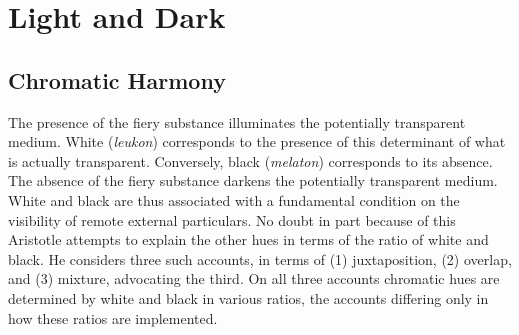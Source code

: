 \chapter{Light and Dark} %
\label{cha:light_and_dark}

\section{Chromatic Harmony} %
\label{sec:chromatic_harmony}
The presence of the fiery substance illuminates the potentially transparent me\-di\-um. White (\emph{leukon}) corresponds to the presence of this determinant of what is actually transparent. Conversely, black (\emph{melaton}) corresponds to its absence. The absence of the fiery substance darkens the potentially transparent medium. White and black are thus associated with a fundamental condition on the visibility of remote external particulars. No doubt in part because of this Aristotle attempts to explain the other hues in terms of the ratio of white and black. He considers three such accounts, in terms of (1) juxtaposition, (2) overlap, and (3) mixture, advocating the third. On all three accounts chromatic hues are determined by white and black in various ratios, the accounts differing only in how these ratios are implemented. 

